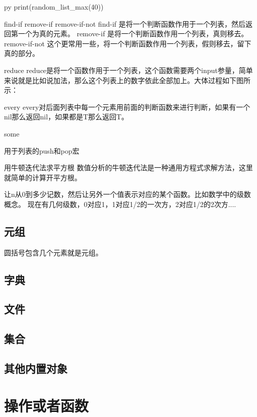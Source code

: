 \documentclass[12pt,oneside]{book}
\begin{document}
\begin{common-format}
\begin{xverbatim}[129]{py}
print(random_list_max(40))
\end{xverbatim}


find-if                 remove-if                 remove-if-not
find-if  是将一个判断函数作用于一个列表，然后返回第一个为真的元素。
remove-if 是将一个判断函数作用一个列表，真则移去。
remove-if-not  这个更常用一些，将一个判断函数作用一个列表，假则移去，留下真的部分。

reduce
reduce是将一个函数作用于一个列表，这个函数需要两个input参量，简单来说就是比如说加法，那么这个列表上的数字依此全部加上。大体过程如下图所示：

every
every对后面列表中每一个元素用前面的判断函数来进行判断，如果有一个nil那么返回nil，如果都是T那么返回T。

some

用于列表的push和pop宏

用牛顿迭代法求平方根
数值分析的牛顿迭代法是一种通用方程式求解方法，这里就简单的计算开平方根。


让n从0到多少记数，然后让另外一个值表示对应的某个函数。比如数学中的级数概念。
现在有几何级数，0对应1，1对应1/2的一次方，2对应1/2的2次方....


\section{元组}
圆括号包含几个元素就是元组。

\section{字典}

%
\section{文件}


\section{集合}


\section{其他内置对象}



\chapter{操作或者函数}

\end{common-format}
\end{document}
